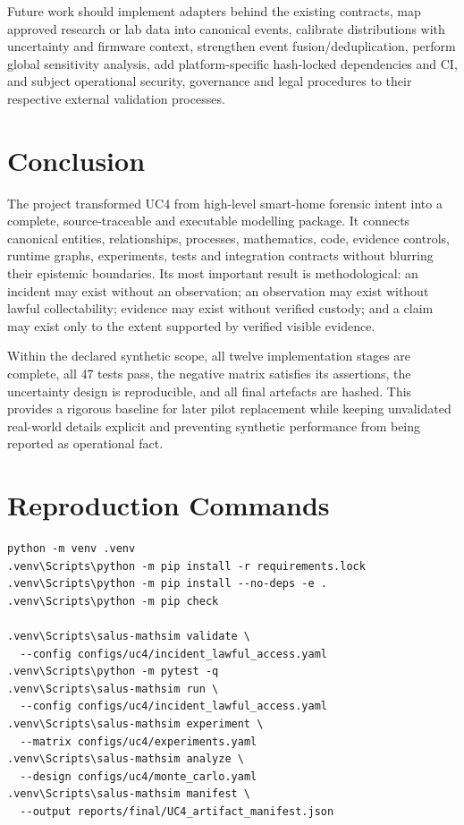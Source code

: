 ﻿\documentclass[11pt,a4paper]{article}
\begin{document}
Future work should implement adapters behind the existing contracts, map approved research or lab data into canonical events, calibrate distributions with uncertainty and firmware context, strengthen event fusion/deduplication, perform global sensitivity analysis, add platform-specific hash-locked dependencies and CI, and subject operational security, governance and legal procedures to their respective external validation processes.

\section{Conclusion}

The project transformed UC4 from high-level smart-home forensic intent into a complete, source-traceable and executable modelling package. It connects canonical entities, relationships, processes, mathematics, code, evidence controls, runtime graphs, experiments, tests and integration contracts without blurring their epistemic boundaries. Its most important result is methodological: an incident may exist without an observation; an observation may exist without lawful collectability; evidence may exist without verified custody; and a claim may exist only to the extent supported by verified visible evidence.

Within the declared synthetic scope, all twelve implementation stages are complete, all 47 tests pass, the negative matrix satisfies its assertions, the uncertainty design is reproducible, and all final artefacts are hashed. This provides a rigorous baseline for later pilot replacement while keeping unvalidated real-world details explicit and preventing synthetic performance from being reported as operational fact.

\appendix

\section{Reproduction Commands}

\begin{lstlisting}[language={}]
python -m venv .venv
.venv\Scripts\python -m pip install -r requirements.lock
.venv\Scripts\python -m pip install --no-deps -e .
.venv\Scripts\python -m pip check

.venv\Scripts\salus-mathsim validate \
  --config configs/uc4/incident_lawful_access.yaml
.venv\Scripts\python -m pytest -q
.venv\Scripts\salus-mathsim run \
  --config configs/uc4/incident_lawful_access.yaml
.venv\Scripts\salus-mathsim experiment \
  --matrix configs/uc4/experiments.yaml
.venv\Scripts\salus-mathsim analyze \
  --design configs/uc4/monte_carlo.yaml
.venv\Scripts\salus-mathsim manifest \
  --output reports/final/UC4_artifact_manifest.json
\end{lstlisting}
\end{document}
